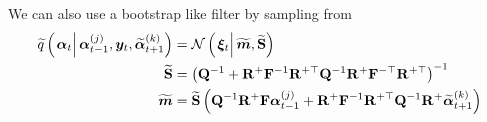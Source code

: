 \documentclass[9pt, notitlepage]{article}
\renewcommand{\vec}[1]{\bm{#1}}
\newcommand{\vect}[1]{\widetilde{\vec{#1}}}
\newcommand{\mat}[1]{\mathbf{#1}}
\newcommand{\matt}[1]{\widetilde{\mat{#1}}}
\newcommand{\Lparen}[1]{\left( #1\right)}
\newcommand{\Cond}[2]{\left. #1 \vphantom{#2} \right\vert  #2}
\newcommand{\optor}[2]{#1\Lparen{#2}}
\newcommand{\optorC}[3]{\optor{#1}{\Cond{#2}{#3}}}
\newcommand{\normalC}[3]{\optorC{\mathcal{N}}{#1}{#2,#3}}
\newcommand{\IDAproxC}[2]{\optorC{\widetilde{q}}{#1}{#2}}
\newcommand{\partic}[3]{#1_{#2}^{\Lparen{#3}}}
\newcommand{\particB}[3]{\widetilde{#1}_{#2}^{\Lparen{#3}}}
\begin{document}
%
We can also use a bootstrap like filter by sampling from%
%
\begin{equation}\begin{split}
	\IDAproxC{\vec{\alpha}_t}{\partic{\vec{\alpha}}{t-1}{j},\vec{y}_t, \particB{\vec{\alpha}}{t+1}{k}} &=
		\normalC{\vec{\xi}_t}{\vect{m}}{\matt{S}} \\
%
	\matt{S} &= \Lparen{
	     \mat{Q}^{-1} + 
	     \mat{R}^{+}\mat{F}^{-1}\mat{R}^{+\top}\mat{Q}^{-1}
	     \mat{R}^{+}\mat{F}^{-\top}\mat{R}^{+\top}}^{-1} \\
%
	\vect{m} &= \matt{S}\Lparen{
			 \mat{Q}^{-1}\mat{R}^+\mat{F}\partic{\vec{\alpha}}{t-1}{j} +
			 \mat{R}^{+}\mat{F}^{-1}\mat{R}^{+\top}
			 \mat{Q}^{-1}\mat{R}^+\particB{\vec{\alpha}}{t + 1}{k}}
\end{split}\end{equation}

\newpage
\end{document}
